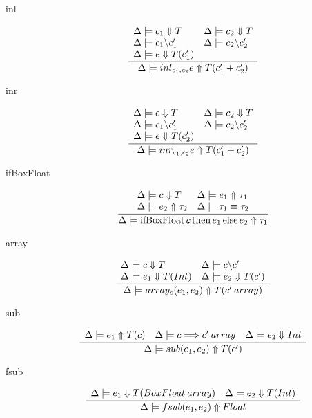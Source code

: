 \documentclass[12pt,twoside,fleqn]{amsart}
\theoremstyle{plain}
\theoremstyle{plain}
\theoremstyle{definition}
\begin{document}
\begin{description}
\item [inl]
\[
\frac{\begin{array}{ll}
\Delta  \models c_{1} \Downarrow T & \Delta  \models c_{2} \Downarrow T\\
\Delta  \models c_{1} \backslash c_{1}' & \Delta  \models c_{2} \backslash c_{2}'\\
\Delta  \models e \Downarrow T(c_{1}') & 
\end{array} }{\Delta  \models inl_{c_{1} ,c_{2} }e  \Uparrow T(c_{1}'+c_{2}')  }\]

\item [inr]
\[
\frac{\begin{array}{ll}
\Delta  \models c \Downarrow T & \Delta  \models c_{2} \Downarrow T\\
\Delta  \models c_{1} \backslash c_{1}' & \Delta  \models c_{2} \backslash c_{2}'\\
\Delta  \models e \Downarrow T(c_{2}') & 
\end{array} }{\Delta  \models inr_{c_{1} ,c_{2} }e  \Uparrow T(c_{1}'+c_{2}')  }\]

\item [ifBoxFloat]
\[
\frac{\begin{array}{ll}
\Delta  \models c \Downarrow T & \Delta  \models e_{1}  \Uparrow \tau _{1} \\
\Delta  \models e_{2}  \Uparrow \tau _{2}  & \Delta  \models \tau _{1}  \equiv \tau _{2} 
\end{array} }{\Delta  \models \mathrm{ifBoxFloat}\, c \, \mathrm{then}\, e_{1} \, \mathrm{else}\, e_{2}  \Uparrow \tau _{1}  }\]

\item [array]
\[
\frac{\begin{array}{ll}
\Delta  \models c \Downarrow T & \Delta  \models c \backslash c'\\
\Delta  \models e_{1} \Downarrow T(Int) & \Delta  \models e_{2} \Downarrow T(c')
\end{array} }{\Delta  \models array_{c }(e_{1} ,e_{2} )  \Uparrow T(c' \: array ) }\]

\item [sub]
\[
\frac{\begin{array}{lll}
\Delta  \models e_{1}  \Uparrow T(c)  & \Delta  \models c \Longrightarrow c' \: array & \Delta  \models e_{2} \Downarrow Int
\end{array} }{\Delta  \models sub(e_{1} ,e_{2} )  \Uparrow T(c')  }\]

\item [fsub]
\[
\frac{\begin{array}{ll}
\Delta  \models e_{1} \Downarrow T(BoxFloat \: array) & \Delta  \models e_{2} \Downarrow T(Int)
\end{array} }{\Delta  \models fsub(e_{1} ,e_{2} )  \Uparrow Float  }\]

\end{description}
\end{document}
